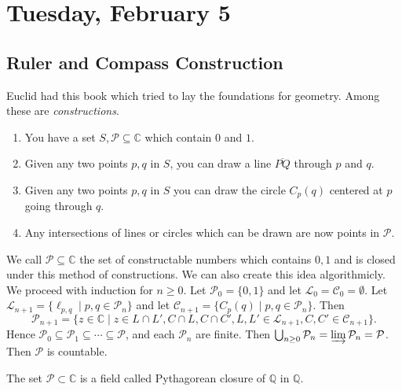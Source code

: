 
\section{Tuesday, February 5}

\subsection{Ruler and Compass Construction}

Euclid had this book which tried to lay the foundations for geometry. Among these are \emph{constructions}.

\begin{enumerate}
\item You have a set $S, \mathcal{P} \subseteq \mathbb{C}$ which contain $0$ and $1$.
\item Given any two points $p,q$ in $S$, you can draw a line $\overline{PQ}$ through $p$ and $q$.
\item Given any two points $p,q$ in $S$ you can draw the circle $C_p(q)$ centered at $p$ going through $q$.
\item Any intersections of lines or circles which can be drawn are now points in $\mathcal{P}$.
\end{enumerate}

We call $\mathcal{P} \subseteq \mathbb{C}$ the set of constructable numbers which contains $0,1$ and is closed under this method of constructions. We can also create this idea algorithmicly. We proceed with induction for $n \geq 0$. Let $\mathcal{P}_0 = \{0,1\}$ and let $\mathcal{L}_0 = \mathcal{C}_0 = \emptyset$. Let $\mathcal{L}_{n+1} = \{\ell_{p,q} \mid p,q \in \mathcal{P}_n\}$ and let $\mathcal{C}_{n+1} = \{C_p(q) \mid p,q \in \mathcal{P}_{n}\}$. Then \[\mathcal{P}_{n+1} = \{z \in \mathbb{C} \mid z \in L \cap L', C \cap L, C \cap C', L,L' \in \mathcal{L}_{n+1},C,C' \in \mathcal{C}_{n+1}\}.\]
Hence $\mathcal{P}_0 \subseteq \mathcal{P}_1 \subseteq \cdots \subseteq \mathcal{P}$, and each $\mathcal{P}_n$ are finite. Then $\bigcup_{n \geq 0} \mathcal{P}_n = \varinjlim \mathcal{P}_n = \mathcal{P}$. Then $\mathcal{P}$ is countable.

\begin{theorem}
The set $\mathcal{P} \subset \mathbb{C}$ is a field called Pythagorean closure of $\mathbb{Q}$ in $\mathbb{Q}$.
\end{theorem}

